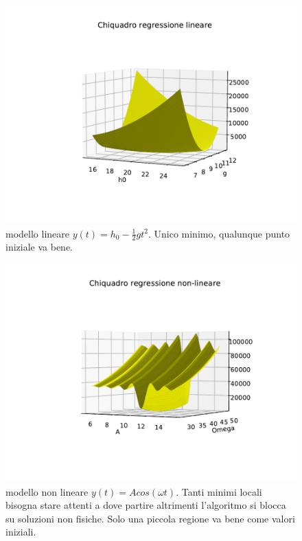 \documentclass[10pt,a4paper]{article}
\begin{document}
\FloatBarrier
\begin{figure}[h]
\centering
\includegraphics[scale=0.8]{img/chi_lin.pdf}
\caption{modello lineare $y(t)=h_0 - \frac{1}{2}gt^2$. Unico minimo, qualunque punto iniziale va bene.}
\end{figure}
\FloatBarrier
\FloatBarrier
\begin{figure}
\centering
\includegraphics[scale=0.8]{img/chi_nlin.pdf}
\caption{modello non lineare $y(t)=Acos(\omega t)$. Tanti minimi locali bisogna stare attenti a dove partire altrimenti l'algoritmo si blocca su soluzioni non fisiche. Solo una piccola regione va bene come valori iniziali.}
\end{figure}
\FloatBarrier
\end{document}
